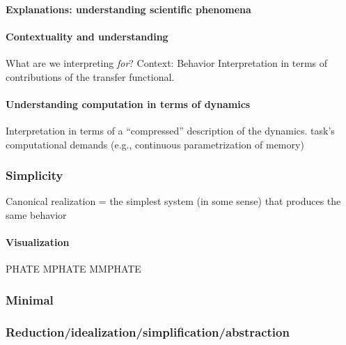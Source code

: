 \documentclass{article}
\theoremstyle{definition} \newtheorem{definition}{Definition}  \newtheorem{example}{Example}
\theoremstyle{remark} \newtheorem{remark}{Remark}
\newcounter{ct}
\begin{document}
\paragraph{Explanations: understanding scientific phenomena}
\citep{parascandolo2021learning}

\paragraph{Contextuality and understanding}
What are we interpreting \emph{for}?
Context: Behavior %
Interpretation in terms of contributions of the transfer functional. 


\paragraph{Understanding computation in terms of dynamics}
Interpretation in terms of a ``compressed'' description of the dynamics.
%
task's computational demands (e.g., continuous parametrization of memory)


\subsubsection{Simplicity}
\citep{gao2015simplicity}
\citep{dyer2023simplest}
\citep{quinn2022information}%
%
Canonical realization = the simplest system (in some sense) that produces the same behavior


\paragraph{Visualization}
\citep{deregt2017understanding}
\citep{karpathy2015visualizing}
PHATE \citep{moon2017visualizing}
MPHATE\citep{gigante2019visualizing}
MMPHATE\citep{xie2024multiway} 
\citep{madsen2019visualizing}

\subsubsection{Minimal}
\citep{beer1996toward}
\citep{lafferriere2000minimal}
\citep{chirimuuta2014minimal}
\citep{batterman2014minimal}
\citep{brancazio2023minimal}
\citep{Jordan2019a}


\subsubsection{Reduction/idealization/simplification/abstraction}
\citep{marr1976computation, marr2010vision}
\citep{chirimuuta2018mmm} %
\citep{potochnik2021levels,
potochnik2020idealization,
potochnik2017idealization}
\citep{stinson2020idealized}
\citep{chirimuuta2024brain} 
\end{document}

